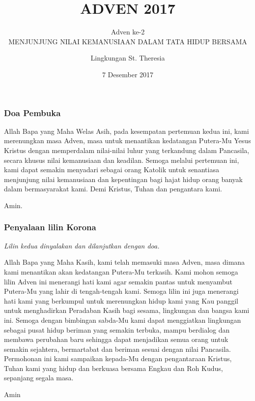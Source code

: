 \documentclass[11pt]{beamer}
\begin{document}
	\author{Lingkungan St. Theresia}
	\title{ADVEN 2017}
	\date{7 Desember 2017}
	\subtitle{Adven ke-2\\MENJUNJUNG NILAI KEMANUSIAAN
	DALAM TATA HIDUP BERSAMA}
	\frame[plain]{\maketitle}
	
	\begin{frame}
		\frametitle{Doa Pembuka}
		Allah Bapa yang Maha Welas Asih, pada kesempatan
		pertemuan kedua ini, kami merenungkan masa Adven,
		masa untuk menantikan kedatangan Putera-Mu Yesus
		Kristus dengan memperdalam nilai-nilai luhur yang
		terkandung dalam Pancasila, secara khusus nilai
		kemanusiaan dan keadilan. Semoga melalui pertemuan ini,
		kami dapat semakin menyadari sebagai orang Katolik
		untuk senantiasa menjunjung nilai kemanusiaan dan
		kepentingan bagi hajat hidup orang banyak dalam
		bermasyarakat kami. Demi Kristus, Tuhan dan pengantara
		kami.
		
		Amin.
	\end{frame}

	\begin{frame}
		\frametitle{Penyalaan lilin Korona}
\textit{Lilin kedua dinyalakan dan dilanjutkan dengan doa.}

Allah Bapa yang Maha Kasih, kami telah memasuki masa
Adven, masa dimana kami menantikan akan kedatangan
Putera-Mu terkasih. Kami mohon semoga lilin Adven ini
menerangi hati kami agar semakin pantas untuk
menyambut Putera-Mu yang lahir di tengah-tengah kami.
Semoga lilin ini juga menerangi hati kami yang
berkumpul untuk merenungkan hidup kami yang Kau
panggil untuk menghadirkan Peradaban Kasih bagi
sesama, lingkungan dan bangsa kami ini. Semoga dengan
bimbingan sabda-Mu kami dapat menggiatkan lingkungan
sebagai pusat hidup beriman yang semakin terbuka,
mampu berdialog dan membawa perubahan baru sehingga
dapat menjadikan semua orang untuk semakin sejahtera,
bermartabat dan beriman sesuai dengan nilai Pancasila.
Permohonan ini kami sampaikan kepada-Mu dengan
pengantaraan Kristus, Tuhan kami yang hidup dan
berkuasa bersama Engkau dan Roh Kudus, sepanjang
segala masa.

Amin
	\end{frame}
\end{document}
